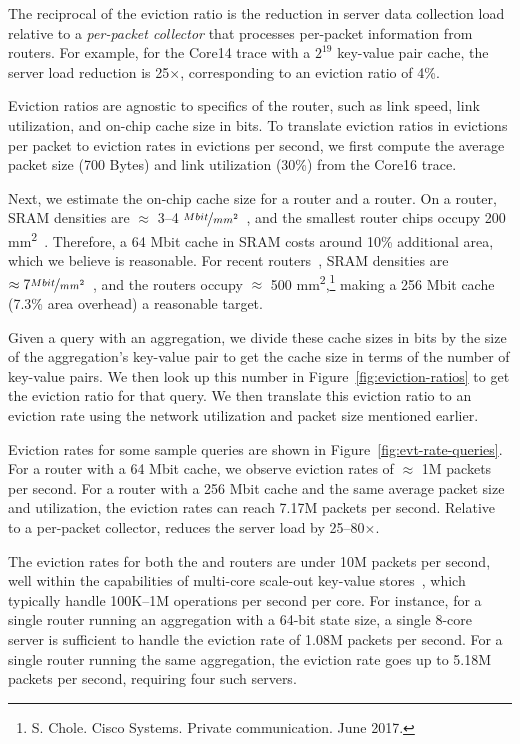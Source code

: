 The reciprocal of the eviction ratio is the reduction in server data collection
load relative to a {\em per-packet collector} that processes per-packet
information from routers. For example, for the Core14 trace with a $2^{19}$
key-value pair cache, the server load reduction is 25$\times$, corresponding to
an eviction ratio of 4\%.

Eviction ratios are agnostic to specifics of the router, such as link speed,
link utilization, and on-chip cache size in bits. To translate eviction ratios
in evictions per packet to eviction rates in evictions per second, we first
compute the average packet size (700 Bytes) and link utilization (30\%) from
the Core16 trace.

Next, we estimate the on-chip cache size for a \tengrouter router and a
\hundredgrouter router. On a \tengrouter router, SRAM densities are $\approx$
3--4 $\nicefrac{Mbit}{mm^2}$~\cite{sram_45nm_wiki}, and the smallest router
chips occupy 200 \si{\milli\metre\squared}~\cite{gibb_parsing}.  Therefore, a
64 Mbit cache in SRAM costs around 10\% additional area, which we believe is
reasonable.  For recent \hundredgrouter routers~\cite{tomahawk2}, SRAM
densities are $\approx7 \nicefrac{Mbit}{mm^2}$~\cite{sram_estimate}, and the
routers occupy $\approx$ 500 \si{\milli\metre\squared},\footnote{S. Chole.
Cisco Systems. Private communication.  June 2017.} making a 256 Mbit cache
(7.3\% area overhead) a reasonable target.

Given a query with an aggregation, we divide these cache sizes in bits by the
size of the aggregation's key-value pair to get the cache size in terms of the
number of key-value pairs. We then look up this number in
Figure~\ref{fig:eviction-ratios} to get the eviction ratio for that query.  We
then translate this eviction ratio to an eviction rate using the network
utilization and packet size mentioned earlier.

Eviction rates for some sample queries are shown in
Figure~\ref{fig:evt-rate-queries}.  For a \tengrouter router with a 64 Mbit
cache, we observe eviction rates of $\approx$ 1M packets per second.  For a
\hundredgrouter router with a 256 Mbit cache and the same average packet size
and utilization, the eviction rates can reach 7.17M packets per second.
Relative to a per-packet collector, \TheSystem reduces the server load by
25--80$\times$.

The eviction rates for both the \tenglink and \hundredglink routers are under
10M packets per second, well within the capabilities of multi-core scale-out
key-value stores~\cite{redis_benchmark, memcached_benchmark,
redis_vs_memcached_update}, which typically handle 100K--1M operations per
second per core.  For instance, for a single \tengrouter router running an
aggregation with a 64-bit state size, a single 8-core server is sufficient to
handle the eviction rate of 1.08M packets per second. For a single
\hundredgrouter router running the same aggregation, the eviction rate goes up
to 5.18M packets per second, requiring four such servers.

